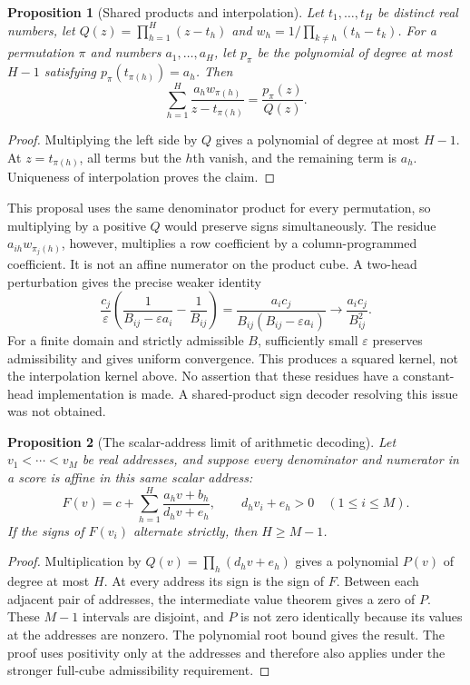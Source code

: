 \documentclass[11pt]{article}
\newtheorem{proposition}{Proposition}
\begin{document}
\begin{proposition}[Shared products and interpolation]
Let $t_1,\ldots,t_H$ be distinct real numbers, let
$Q(z)=\prod_{h=1}^H(z-t_h)$ and
$w_h=1/\prod_{k\ne h}(t_h-t_k)$. For a permutation $\pi$ and numbers
$a_1,\ldots,a_H$, let $p_\pi$ be the polynomial of degree at most
$H-1$ satisfying $p_\pi(t_{\pi(h)})=a_h$. Then
\[
 \sum_{h=1}^H\frac{a_h w_{\pi(h)}}{z-t_{\pi(h)}}
 =\frac{p_\pi(z)}{Q(z)}.
\]
\end{proposition}
\begin{proof}
Multiplying the left side by $Q$ gives a polynomial of degree at most
$H-1$. At $z=t_{\pi(h)}$, all terms but the $h$th vanish, and the
remaining term is $a_h$. Uniqueness of interpolation proves the claim.
\end{proof}

This proposal uses the same denominator product for every permutation,
so multiplying by a positive $Q$ would preserve signs simultaneously.
The residue $a_{ih}w_{\pi_j(h)}$, however, multiplies a row coefficient
by a column-programmed coefficient. It is not an affine numerator on
the product cube. A two-head perturbation gives the precise weaker
identity
\[
 \frac{c_j}{\varepsilon}
 \left(\frac1{B_{ij}-\varepsilon a_i}-\frac1{B_{ij}}\right)
 =\frac{a_i c_j}{B_{ij}(B_{ij}-\varepsilon a_i)}
 \longrightarrow\frac{a_i c_j}{B_{ij}^2}.
\]
For a finite domain and strictly admissible $B$, sufficiently small
$\varepsilon$ preserves admissibility and gives uniform convergence.
This produces a squared kernel, not the interpolation kernel above.
No assertion that these residues have a constant-head implementation
is made. A shared-product sign decoder resolving this issue was not
obtained.

\begin{proposition}[The scalar-address limit of arithmetic decoding]
Let $v_1<\cdots<v_M$ be real addresses, and suppose every denominator
and numerator in a score is affine in this same scalar address:
\[
 F(v)=c+\sum_{h=1}^H\frac{a_h v+b_h}{d_h v+e_h},
 \qquad d_hv_i+e_h>0\quad(1\le i\le M).
\]
If the signs of $F(v_i)$ alternate strictly, then $H\ge M-1$.
\end{proposition}
\begin{proof}
Multiplication by $Q(v)=\prod_h(d_hv+e_h)$ gives a polynomial
$P(v)$ of degree at most $H$. At every address its sign is the sign
of $F$. Between each adjacent pair of addresses, the intermediate
value theorem gives a zero of $P$. These $M-1$ intervals are disjoint,
and $P$ is not zero identically because its values at the addresses
are nonzero. The polynomial root bound gives the result. The proof
uses positivity only at the addresses and therefore also applies
under the stronger full-cube admissibility requirement.
\end{proof}
\end{document}
